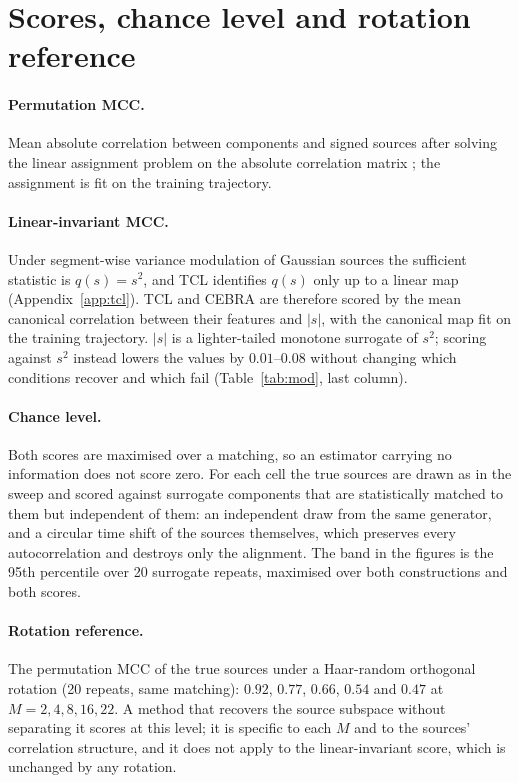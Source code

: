 \section{Scores, chance level and rotation reference}
\label{app:scores}

\paragraph{Permutation MCC.} Mean absolute correlation between components and signed sources after solving the linear assignment problem on the absolute correlation matrix \citep{hyvarinen2016tcl}; the assignment is fit on the training trajectory.
\paragraph{Linear-invariant MCC.} Under segment-wise variance modulation of Gaussian sources the sufficient statistic is $q(s) = s^2$, and TCL identifies $q(s)$ only up to a linear map (Appendix~\ref{app:tcl}).
TCL and CEBRA are therefore scored by the mean canonical correlation between their features and $|s|$, with the canonical map fit on the training trajectory.
$|s|$ is a lighter-tailed monotone surrogate of $s^2$; scoring against $s^2$ instead lowers the values by $0.01$--$0.08$ without changing which conditions recover and which fail (Table~\ref{tab:mod}, last column).
\paragraph{Chance level.} Both scores are maximised over a matching, so an estimator carrying no information does not score zero.
For each cell the true sources are drawn as in the sweep and scored against surrogate components that are statistically matched to them but independent of them: an independent draw from the same generator, and a circular time shift of the sources themselves, which preserves every autocorrelation and destroys only the alignment.
The band in the figures is the 95th percentile over 20 surrogate repeats, maximised over both constructions and both scores.
\paragraph{Rotation reference.} The permutation MCC of the true sources under a Haar-random orthogonal rotation (20 repeats, same matching): $0.92$, $0.77$, $0.66$, $0.54$ and $0.47$ at $M = 2, 4, 8, 16, 22$.
A method that recovers the source subspace without separating it scores at this level; it is specific to each $M$ and to the sources' correlation structure, and it does not apply to the linear-invariant score, which is unchanged by any rotation.

